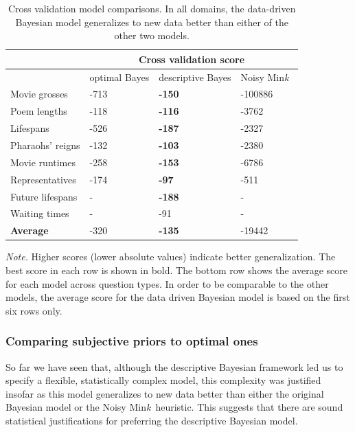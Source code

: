 \documentclass[doc,floatsintext]{apa6}
\newcommand{\mink}{{Min\textit{k}\ }}
\begin{document}
\begin{table}
\centering
\begin{threeparttable}
    \caption{Cross validation model comparisons. In all domains, the data-driven Bayesian model generalizes to new data better than either of the other two models.}
    \begin{tabular}{llll}
      \toprule
		& \multicolumn{3}{c}{Cross validation score}\\
		\midrule
		 & optimal Bayes & descriptive Bayes  & Noisy \mink \\
      \midrule
        Movie grosses & -713 & \textbf{-150} & -100886\\
		Poem lengths & -118 & \textbf{-116} & -3762\\
		Lifespans & -526 & \textbf{-187} & -2327\\
		Pharaohs' reigns & -132 & \textbf{-103} & -2380\\
		Movie runtimes & -258 & \textbf{-153} & -6786\\
		Representatives & -174 & \textbf{-97} & -511\\
		Future lifespans & - & \textbf{-188} & - \\
		Waiting times & - & -91 & - \\
		\textbf{Average} & -320 & \textbf{-135} & -19442\\
      \midrule
    \end{tabular}
    \begin{tablenotes}
      \small
      \item \textit{Note.} Higher scores (lower absolute values) indicate better generalization. The best score in each row is shown in bold. The bottom row shows the average score for each model across question types. In order to be comparable to the other models, the average score for the data driven Bayesian model is based on the first six rows only.
    \end{tablenotes}
\label{tbl:cross_validation}
\end{threeparttable}
\end{table}

\bigskip
\subsubsection*{Comparing subjective priors to optimal ones}

So far we have seen that, although the descriptive Bayesian framework led us to specify a flexible, statistically complex model, this complexity was justified insofar as this model generalizes to new data better than either the original Bayesian model or the Noisy \mink heuristic. This suggests that there are sound statistical justifications for preferring the descriptive Bayesian model.
\end{document}

